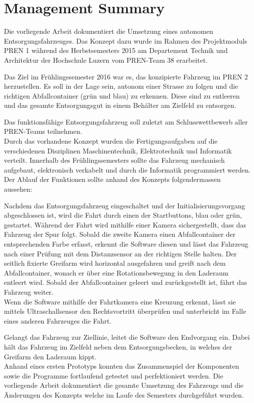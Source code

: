 \newpage
\section*{Management Summary}
Die vorliegende Arbeit dokumentiert die Umsetzung eines autonomen Entsorgungsfahrzeuges. Das Konzept dazu wurde im Rahmen des Projektmoduls PREN 1 während des Herbstsemesters 2015 am Departement Technik und Architektur der Hochschule Luzern vom PREN-Team 38 erarbeitet.

Das Ziel im Frühlingssemester 2016 war es, das konzipierte Fahrzeug im PREN 2 herzustellen. Es soll in der Lage sein, autonom einer Strasse zu folgen und die richtigen Abfallcontainer (grün und blau) zu erkennen. Diese sind zu entleeren und das gesamte Entsorgungsgut in einem Behälter am Zielfeld zu entsorgen.

Das funktionsfähige Entsorgungsfahrzeug soll zuletzt am Schlusswettbewerb aller PREN-Teams teilnehmen.\\

Durch das vorhandene Konzept wurden die Fertigungsaufgaben auf die verschiedenen Disziplinen Maschinentechnik, Elektrotechnik und Informatik verteilt. Innerhalb des Frühlingssemesters sollte das Fahrzeug mechanisch aufgebaut, elektronisch verkabelt und durch die Informatik programmiert werden.\\

Der Ablauf der Funktionen sollte anhand des Konzepts folgendermassen aussehen:

Nachdem das Entsorgungsfahrzeug eingeschaltet und der Initialisierungsvorgang abgeschlossen ist, wird die Fahrt durch einen der Startbuttons, blau oder grün, gestartet. Während der Fahrt wird mithilfe einer Kamera sichergestellt, dass das Fahrzeug der Spur folgt. Sobald die zweite Kamera einen Abfallcontainer der entsprechenden Farbe erfasst, erkennt die Software diesen und lässt das Fahrzeug nach einer Prüfung mit dem Distanzsensor an der richtigen Stelle halten. Der seitlich fixierte Greifarm wird horizontal ausgefahren und greift nach dem Abfallcontainer, wonach er über eine Rotationsbewegung in den Laderaum entleert wird. Sobald der Abfallcontainer geleert und zurückgestellt ist, fährt das Fahrzeug weiter.\\
Wenn die Software mithilfe der Fahrtkamera eine Kreuzung erkennt, lässt sie mittels Ultraschallsensor den Rechtsvortritt überprüfen und unterbricht im Falle eines anderen Fahrzeuges die Fahrt.

Gelangt das Fahrzeug zur Ziellinie, leitet die Software den Endvorgang ein. Dabei hält das Fahrzeug im Zielfeld neben dem Entsorgungsbecken, in welches der Greifarm den Laderaum kippt.\\

Anhand eines ersten Prototyps konnten das Zusammenspiel der Komponenten sowie die Programme fortlaufend getestet und perfektioniert werden. Die vorliegende Arbeit dokumentiert die gesamte Umsetzung des Fahrzeugs und die Änderungen des Konzepts welche im Laufe des Semesters durchgeführt wurden.